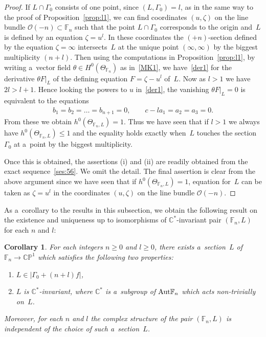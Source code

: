 \documentclass[pdftex]{sigma}
\numberwithin{equation}{section}
\newtheorem{Corollary}[Theorem]{Corollary}
\begin{document}
\begin{proof}
If $L\cap \Gamma_0$ consists of one point, since $(L,\Gamma_0)=l$, as in the same way to the proof of
Proposition~\ref{prop:l1}, we can f\/ind coordinates $(u,\zeta)$ on the line bundle $\mathscr O(-n)\subset\mathbb{F}_n$
such that the point $L\cap \Gamma_0$ corresponds to the origin and~$L$ is def\/ined by an equation $\zeta = u^l$.
In these coordinates the $(+n)$-section def\/ined by the equation $\zeta=\infty$ intersects~$L$ at the unique point
$(\infty,\infty)$ by the biggest multiplicity $(n+l)$.
Then using the computations in Proposition~\ref{prop:l1}, by writing a~vector f\/ield $\theta\in H^0(\Theta_{\mathbb{F}_n})$
as in~\eqref{MK1}, we have~\eqref{der1} for the derivative $\theta F|_L$ of the def\/ining equation $F=\zeta-u^l$ of~$L$.
Now as $l>1$ we have $2l>l+1$.
Hence looking the powers to $u$ in~\eqref{der1}, the vanishing $\theta F|_L = 0$ is equivalent to the equations
\begin{gather*}
b_1=b_2=\dots=b_{n+1} = 0,
\qquad
c-la_1 = a_2 = a_3 = 0.
\end{gather*}
From these we obtain $h^0(\Theta_{\mathbb{F}_n, L})=1$.
Thus we have seen that if $l>1$ we always have \mbox{$h^0(\Theta_{\mathbb{F}_n,L}) \le 1$} and the equality holds exactly
when~$L$ touches the section $\Gamma_0$ at a~point by the biggest multiplicity.

Once this is obtained, the assertions (i) and (ii) are readily obtained from the exact sequence~\eqref{ses:56}.
We omit the detail.
The f\/inal assertion is clear from the above argument since we have seen that if $h^0(\Theta_{\mathbb{F}_n,L}) = 1$,
equation for~$L$ can be taken as $\zeta=u^l$ in the coordinates $(u,\zeta)$ on the line bundle $\mathscr O(-n)$.
\end{proof}

As a~corollary to the results in this subsection, we obtain the following result on the existence and uniqueness up to
isomorphisms of $\mathbb{C}^*$-invariant pair $(\mathbb{F}_n,L)$ for each $n$ and $l$:

\begin{Corollary}\label{cor:unique}
For each integers $n\ge 0$ and $l\ge 0$, there exists a~section~$L$ of $\mathbb{F}_n\to\mathbb{CP}^1$ which satisfies
the following two properties:
\begin{enumerate}\itemsep=0pt
\item[$(i)$] $L\in |\Gamma_0+(n+l)f|$,
\item[$(ii)$] $L$ is $\mathbb{C}^*$-invariant, where $\mathbb{C}^*$ is a~subgroup of ${\rm{Aut}}\mathbb{F}_n$ which acts
non-trivially on~$L$.
\end{enumerate}
Moreover, for each $n$ and $l$ the complex structure of the pair $(\mathbb{F}_n,L)$ is independent of the choice of such
a~section~$L$.
\end{Corollary}
\end{document}

